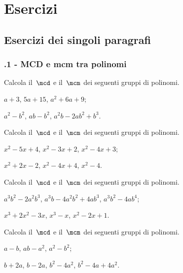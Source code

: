 \section{Esercizi}
\subsection{Esercizi dei singoli paragrafi}
\subsubsection*{\thechapter.1 - MCD e mcm tra polinomi}

\begin{esercizio}[\Ast]
\label{ese:18.1}
Calcola il~$\mcd$ e il~$\mcm$ dei seguenti gruppi di polinomi.
\begin{multicols}{2}
\begin{enumeratea}
 \item $a+3$, $5a+15$, $a^{2}+6a+9$;
 \item $a^{2}-b^{2}$, $ab-b^{2}$, $a^{2}b-2ab^{2}+b^{3}$.
\end{enumeratea}
\end{multicols}
\end{esercizio}

\begin{esercizio}[\Ast]
\label{ese:18.2}
Calcola il~$\mcd$ e il~$\mcm$ dei seguenti gruppi di polinomi.
\begin{multicols}{2}
\begin{enumeratea}
 \item $x^{2}-5x+4$, $x^{2}-3x+2$, $x^{2}-4x+3$;
 \item $x^{2}+2x-2$, $x^{2}-4x+4$, $x^{2}-4$.
\end{enumeratea}
\end{multicols}
\end{esercizio}

\begin{esercizio}[\Ast]
\label{ese:18.3}
Calcola il~$\mcd$ e il~$\mcm$ dei seguenti gruppi di polinomi.
\begin{enumeratea}
 \item $a^{3}b^{2}-2a^{2}b^{3}$, $a^{3}b-4a^{2}b^{2}+4ab^{3}$, $a^{3}b^{2}-4ab^{4}$;
 \item $x^{3}+2x^{2}-3x$, $x^{3}-x$, $x^{2}-2x+1$.
\end{enumeratea}
\end{esercizio}

\begin{esercizio}[\Ast]
\label{ese:18.4}
Calcola il~$\mcd$ e il~$\mcm$ dei seguenti gruppi di polinomi.
\begin{multicols}{2}
\begin{enumeratea}
 \item $a-b$, $ab-a^{2}$, $a^{2}-b^{2}$;
 \item $b+2a$, $b-2a$, $b^{2}-4a^{2}$, $b^{2}-4a+4a^{2}$.
\end{enumeratea}
\end{multicols}
\end{esercizio}

